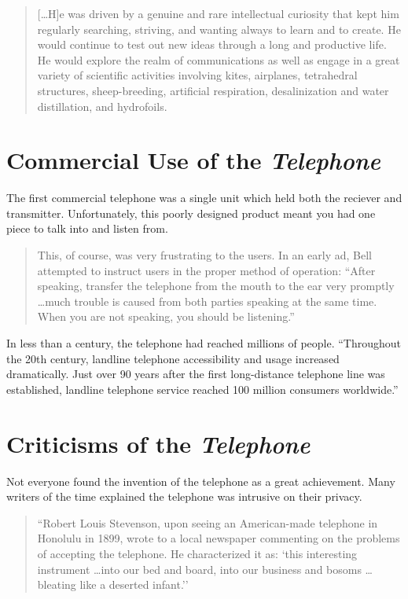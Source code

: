 \documentclass[12pt singlecol]{article}
\begin{document}
\begin{flushleft}
\begin{multicols}{2}
\begin{quotation}
[\ldots H]e was driven by a genuine and rare intellectual curiosity that kept him regularly searching, striving, and wanting always to learn and to create. He would continue to test out new ideas through a long and productive life. He would explore the realm of communications as well as engage in a great variety of scientific activities involving kites, airplanes, tetrahedral structures, sheep-breeding, artificial respiration, desalinization and water distillation, and hydrofoils. \cite[para.~2]{LOC00}
\end{quotation}

\section{Commercial Use of the \emph{Telephone}}
The first commercial telephone was a single unit which held both the reciever and transmitter. Unfortunately, this poorly designed product meant you had one piece to talk into and listen from. 

\begin{quotation}
This, of course, was very frustrating to the users. In an early ad, Bell attempted to instruct users in the proper method of operation: ``After speaking, transfer the telephone from the mouth to the ear very promptly \ldots much trouble is caused from both parties speaking at the same time. When you are not speaking, you should be listening.''\cite[p.~2]{Coe95}
\end{quotation}

In less than a century, the telephone had reached millions of people. ``Throughout the 20th century, landline telephone accessibility and usage increased dramatically. Just over 90 years after the first long-distance telephone line was established, landline telephone service reached 100 million consumers worldwide.''\cite[para.~1]{Belh13}

\section{Criticisms of the \emph{Telephone}}

Not everyone found the invention of the telephone as a great achievement. Many writers of the time explained the telephone was intrusive on their privacy. 

\begin{quotation}
``Robert Louis Stevenson, upon seeing an American-made telephone in Honolulu in 1899, wrote to a local newspaper commenting on the problems of accepting the telephone. He characterized it as: `this interesting instrument \ldots into our bed and board, into our business and bosoms \ldots bleating like a deserted infant.'' \cite[p.~8]{Coe95}
\end{quotation}


\end{multicols}
\end{flushleft}
\end{document}
